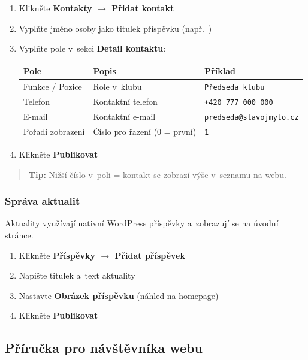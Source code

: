\documentclass[12pt,a4paper]{article}
\begin{document}
\begin{enumerate}
    \item Klikněte \textbf{Kontakty $\rightarrow$ Přidat kontakt}
    \item Vyplňte jméno osoby jako titulek příspěvku (např.\ )
    \item Vyplňte pole v~sekci \textbf{Detail kontaktu}:

    \smallskip
    \begin{tabularx}{\linewidth}{l X l}
    \toprule
    \textbf{Pole} & \textbf{Popis} & \textbf{Příklad} \\
    \midrule
    Funkce / Pozice & Role v~klubu & \texttt{Předseda klubu} \\
    Telefon & Kontaktní telefon & \texttt{+420 777 000 000} \\
    E-mail & Kontaktní e-mail & \texttt{predseda@slavojmyto.cz} \\
    Pořadí zobrazení & Číslo pro řazení (0 = první) & \texttt{1} \\
    \bottomrule
    \end{tabularx}
    \smallskip

    \item Klikněte \textbf{Publikovat}
\end{enumerate}

\begin{quote}
\textbf{Tip:} Nižší číslo v~poli  = kontakt se zobrazí výše v~seznamu na webu.
\end{quote}

\subsubsection{Správa aktualit}

Aktuality využívají nativní WordPress příspěvky a~zobrazují se na úvodní stránce.

\begin{enumerate}
    \item Klikněte \textbf{Příspěvky $\rightarrow$ Přidat příspěvek}
    \item Napište titulek a~text aktuality
    \item Nastavte \textbf{Obrázek příspěvku} (náhled na homepage)
    \item Klikněte \textbf{Publikovat}
\end{enumerate}

\subsection{Příručka pro návštěvníka webu}
\end{document}
